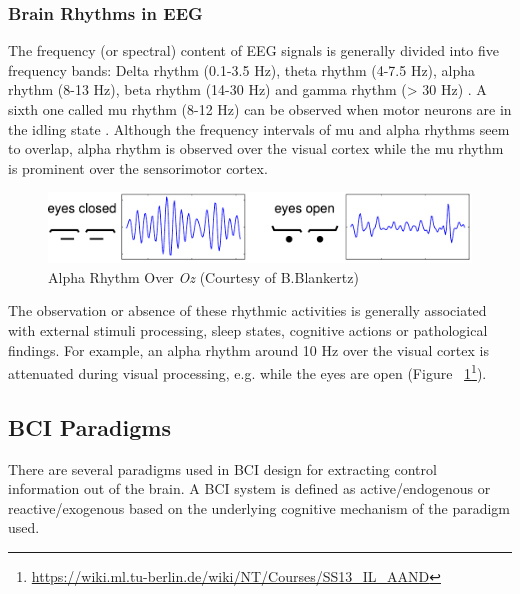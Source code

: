 \documentclass[12pt]{article}
\newcommand\mysubsection[1]{\subsection{#1}}
\newcommand\mysubsubsection[1]{\subsubsection{#1}}
\numberwithin{equation}{section}
\numberwithin{figure}{section}
\numberwithin{table}{section}
\begin{document}
\mysubsubsection{Brain Rhythms in EEG}
\par{
    The frequency (or spectral) content of EEG signals is generally divided into five frequency
    bands: Delta rhythm (0.1-3.5 Hz), theta rhythm (4-7.5 Hz), alpha rhythm (8-13 Hz),
    beta rhythm (14-30 Hz) and gamma rhythm (> 30 Hz) \citep{niedermeyer_electroencephalography:_2005}.
    A sixth one called mu rhythm (8-12 Hz) can be observed when motor neurons are in the idling
    state \citep{wang_practical_2010}. Although the frequency intervals of mu and
    alpha rhythms seem to overlap, alpha rhythm is observed over the visual cortex
    while the mu rhythm is prominent over the sensorimotor cortex.
}
    \par{
    \begin{figure}[ht]
        \centering
        \includegraphics[scale=0.8]{images/alpha_eyes}
        \caption[Alpha Rhythm Over Oz]{Alpha Rhythm Over \emph{Oz} (Courtesy of B.Blankertz)}
        \label{fig:eeg_alpha}
    \end{figure}

    The observation or absence of these rhythmic activities is generally associated
    with external stimuli processing, sleep states, cognitive actions or pathological
    findings. For example, an alpha rhythm around 10 Hz over the visual cortex
    is attenuated during visual processing, e.g. while the eyes are open (Figure ~\ref{fig:eeg_alpha}\footnote{\url{https://wiki.ml.tu-berlin.de/wiki/NT/Courses/SS13_IL_AAND}}).
}

\mysubsection{BCI Paradigms}
\par{
    There are several paradigms used in BCI design for extracting control information
    out of the brain. A BCI system is defined as active/endogenous or
    reactive/exogenous based on the underlying cognitive mechanism of the paradigm used.
}
\end{document}

